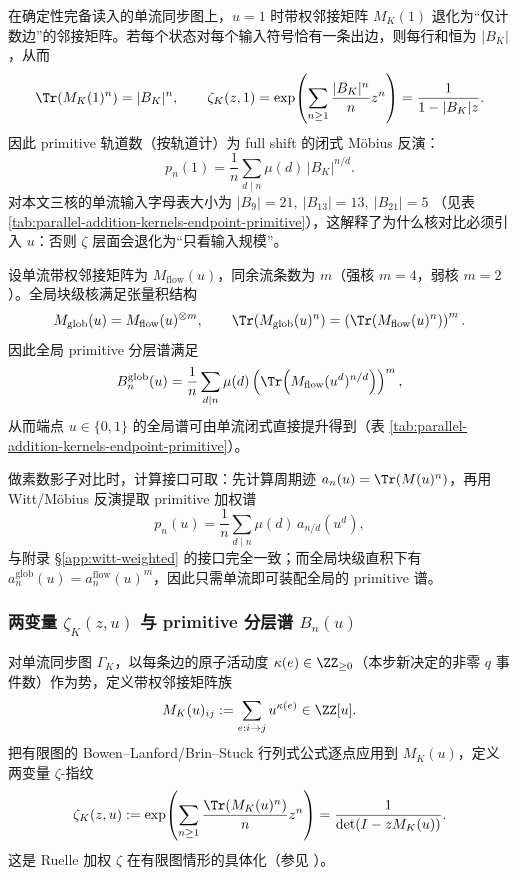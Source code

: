 \begin{corollary}[\texorpdfstring{$u=1$}{u=1} 的无权退化：仅看输入规模的 full shift 基线]\label{cor:par-add-u1-degeneracy}
在确定性完备读入的单流同步图上，$u=1$ 时带权邻接矩阵 $M_K(1)$ 退化为“仅计数边”的邻接矩阵。若每个状态对每个输入符号恰有一条出边，则每行和恒为 $|B_K|$，从而
\[
\Tr(M_K(1)^n)=|B_K|^n,\qquad
\zeta_K(z,1)=\exp\!\left(\sum_{n\ge 1}\frac{|B_K|^n}{n}z^n\right)=\frac{1}{1-|B_K|z}.
\]
因此 primitive 轨道数（按轨道计）为 full shift 的闭式 Möbius 反演：
\[
p_n(1)=\frac{1}{n}\sum_{d\mid n}\mu(d)\,|B_K|^{n/d}.
\]
对本文三核的单流输入字母表大小为
\(
|B_9|=21,\ |B_{13}|=13,\ |B_{21}|=5
\)
（见表 \ref{tab:parallel-addition-kernels-endpoint-primitive}），这解释了为什么核对比必须引入 $u$：否则 $\zeta$ 层面会退化为“只看输入规模”。
\end{corollary}

\begin{corollary}\label{cor:par-add-global-lift-endpoints}
设单流带权邻接矩阵为 $M_{\mathrm{flow}}(u)$，同余流条数为 $m$（强核 $m=4$，弱核 $m=2$）。全局块级核满足张量积结构
\[
M_{\mathrm{glob}}(u)=M_{\mathrm{flow}}(u)^{\otimes m},
\qquad
\Tr(M_{\mathrm{glob}}(u)^n)=\left(\Tr(M_{\mathrm{flow}}(u)^n)\right)^m.
\]
因此全局 primitive 分层谱满足
\[
B^{\mathrm{glob}}_{n}(u)=\frac{1}{n}\sum_{d\mid n}\mu(d)\left(\Tr\!\left(M_{\mathrm{flow}}(u^d)^{n/d}\right)\right)^m,
\]
从而端点 $u\in\{0,1\}$ 的全局谱可由单流闭式直接提升得到（表 \ref{tab:parallel-addition-kernels-endpoint-primitive}）。
\end{corollary}

做素数影子对比时，计算接口可取：先计算周期迹 $a_n(u)=\Tr(M(u)^n)$，再用 Witt/Möbius 反演提取 primitive 加权谱
\[
p_n(u)=\frac{1}{n}\sum_{d\mid n}\mu(d)\,a_{n/d}(u^d),
\]
与附录 \S\ref{app:witt-weighted} 的接口完全一致；而全局块级直积下有 $a_n^{\mathrm{glob}}(u)=a_n^{\mathrm{flow}}(u)^m$，因此只需单流即可装配全局的 primitive 谱。

\subsubsection{两变量 \texorpdfstring{$\zeta_K(z,u)$}{zeta(z,u)} 与 primitive 分层谱 \texorpdfstring{$B_n(u)$}{B\_n(u)}}
对单流同步图 $\Gamma_K$，以每条边的原子活动度 $\kappa(e)\in\ZZ_{\ge 0}$（本步新决定的非零 $q$ 事件数）作为势，定义带权邻接矩阵族
\[
M_K(u)_{ij}:=\sum_{e:i\to j}u^{\kappa(e)}\in\ZZ[u].
\]
把有限图的 Bowen--Lanford/Brin--Stuck 行列式公式逐点应用到 $M_K(u)$，定义两变量 $\zeta$-指纹
\[
\zeta_K(z,u)
:=\exp\!\left(\sum_{n\ge 1}\frac{\Tr(M_K(u)^n)}{n}z^n\right)
=\frac{1}{\det(I-zM_K(u))}.
\]
这是 Ruelle 加权 $\zeta$ 在有限图情形的具体化（参见 \cite{Ruelle1976ZetaExpanding,ParryPollicott1990Zeta,BrinStuck2002}）。

